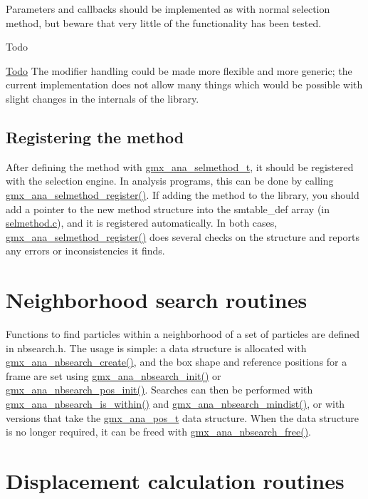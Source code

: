 \-Parameters and callbacks should be implemented as with normal selection method, but beware that very little of the functionality has been tested.

\begin{DoxyRefDesc}{\-Todo}
\item[\hyperlink{todo__todo000003}{\-Todo}]\-The modifier handling could be made more flexible and more generic; the current implementation does not allow many things which would be possible with slight changes in the internals of the library.\end{DoxyRefDesc}
\hypertarget{selmethods_selmethods_register}{}\subsection{\-Registering the method}\label{selmethods_selmethods_register}
\-After defining the method with {\ttfamily \hyperlink{structgmx__ana__selmethod__t}{gmx\-\_\-ana\-\_\-selmethod\-\_\-t}}, it should be registered with the selection engine. \-In analysis programs, this can be done by calling \hyperlink{include_2selmethod_8h_a820231622b6b4dd57fba7570f705498f}{gmx\-\_\-ana\-\_\-selmethod\-\_\-register()}. \-If adding the method to the library, you should add a pointer to the new method structure into the {\ttfamily smtable\-\_\-def} array (in \hyperlink{selmethod_8c}{selmethod.c}), and it is registered automatically. \-In both cases, \hyperlink{include_2selmethod_8h_a820231622b6b4dd57fba7570f705498f}{gmx\-\_\-ana\-\_\-selmethod\-\_\-register()} does several checks on the structure and reports any errors or inconsistencies it finds. \hypertarget{nbsearch}{}\section{\-Neighborhood search routines}\label{nbsearch}
\-Functions to find particles within a neighborhood of a set of particles are defined in nbsearch.\-h. \-The usage is simple\-: a data structure is allocated with \hyperlink{include_2nbsearch_8h_a8f3c442d0b5cc3f0cf00d0178fe86b69}{gmx\-\_\-ana\-\_\-nbsearch\-\_\-create()}, and the box shape and reference positions for a frame are set using \hyperlink{include_2nbsearch_8h_adb93d439fb66a65304f545892dc85685}{gmx\-\_\-ana\-\_\-nbsearch\-\_\-init()} or \hyperlink{include_2nbsearch_8h_a692b6fd5e07c1417b5249a6502100867}{gmx\-\_\-ana\-\_\-nbsearch\-\_\-pos\-\_\-init()}. \-Searches can then be performed with \hyperlink{include_2nbsearch_8h_a13e06dbe851ea6d7c0903360ffaf569f}{gmx\-\_\-ana\-\_\-nbsearch\-\_\-is\-\_\-within()} and \hyperlink{include_2nbsearch_8h_a49c541545147457df662c3c3d33718b2}{gmx\-\_\-ana\-\_\-nbsearch\-\_\-mindist()}, or with versions that take the {\ttfamily \hyperlink{structgmx__ana__pos__t}{gmx\-\_\-ana\-\_\-pos\-\_\-t}} data structure. \-When the data structure is no longer required, it can be freed with \hyperlink{include_2nbsearch_8h_a5281d4ee13a86c089b9911b722f3f512}{gmx\-\_\-ana\-\_\-nbsearch\-\_\-free()}. \hypertarget{displacements}{}\section{\-Displacement calculation routines}\label{displacements}
